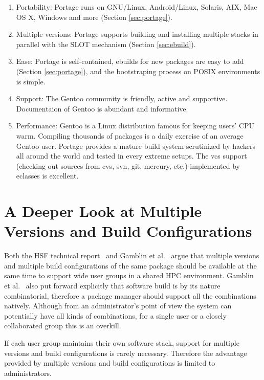 \documentclass[a4paper,conference]{IEEEtran}
\begin{document}
\begin{enumerate}
\item Portability: Portage runs on GNU/Linux, Android/Linux, Solaris,
  AIX, Mac OS X, Windows and more (Section \ref{sec:portage}).
\item Multiple versions: Portage supports building and installing
  multiple stacks in parallel with the SLOT mechanism
  (Section \ref{sec:ebuild}).
\item Ease: Portage is self-contained, ebuilds for new packages are
  easy to add (Section \ref{sec:portage}), and the bootstraping process
  on POSIX environments is simple.
\item Support: The Gentoo community is friendly, active and
  supportive. Documentaion of Gentoo is abundant and informative.
\item Performance: Gentoo is a Linux distribution famous for keeping
  users' CPU warm. Compiling thousands of packages is a daily exercise
  of an average Gentoo user. Portage provides a mature build system
  scrutinized by hackers all around the world and tested in every
  extreme setups. The vcs support (checking out sources from cvs, svn,
  git, mercury, etc.) implemented by eclasses is excellent.
\end{enumerate}

\section{A Deeper Look at Multiple Versions and Build Configurations}

Both the HSF technical report~\cite{hsf:package} and Gamblin et
al.~\cite{spack} argue that multiple versions and multiple build
configurations of the same package should be available at the same
time to support wide user groups in a shared HPC environment. Gamblin
et al.~\cite{spack} also put forward explicitly that software build is
by its nature combinatorial, therefore a package manager should
support all the combinations natively. Although from an administrator's
point of view the system can potentially have all kinds of combinations,
for a single user or a closely collaborated group this is an overkill.

If each user group maintains their own software stack, support for
multiple versions and build configurations is rarely necessary.
Therefore the advantage provided by multiple versions and build
configurations is limited to administrators.
\end{document}

